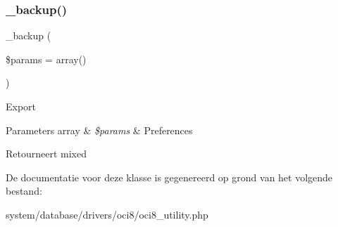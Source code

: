 \subsubsection{\texorpdfstring{\_backup()}{\_backup()}}
{\footnotesize\ttfamily \+\_\+backup (\begin{DoxyParamCaption}\item[{}]{\$params = {\ttfamily array()} }\end{DoxyParamCaption})\hspace{0.3cm}{\ttfamily [protected]}}

Export


\begin{DoxyParams}[1]{Parameters}
array & {\em \$params} & Preferences \\
\hline
\end{DoxyParams}
\begin{DoxyReturn}{Retourneert}
mixed 
\end{DoxyReturn}


De documentatie voor deze klasse is gegenereerd op grond van het volgende bestand\+:\begin{DoxyCompactItemize}
\item 
system/database/drivers/oci8/oci8\+\_\+utility.\+php\end{DoxyCompactItemize}
